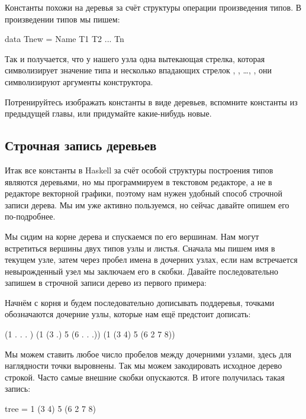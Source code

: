 Константы похожи на деревья за счёт структуры операции
произведения типов. В произведении типов мы пишем:

\begin{code}
data Tnew = Name T1 T2 ... Tn
\end{code}

Так и получается, что у нашего узла  одна вытекающая
стрелка, которая символизирует значение типа  и несколько
впадающих стрелок , , \dots, , они символизируют 
аргументы конструктора.

Потренируйтесь изображать константы в виде деревьев, 
вспомните константы из предыдущей главы, или придумайте 
какие-нибудь новые. 

\subsection{Строчная запись деревьев}

Итак все константы в Haskell за счёт особой структуры построения
типов являются деревьями, но мы программируем в текстовом редакторе,
а не в редакторе векторной графики, поэтому нам нужен удобный способ
строчной записи дерева. Мы им уже активно пользуемся, но
сейчас давайте опишем его по-подробнее. 

Мы сидим на корне дерева и спускаемся по его вершинам. Нам
могут встретиться вершины двух типов узлы и листья. Сначала
мы пишем имя в текущем узле, затем через пробел имена в дочерних
узлах, если нам встречается невырожденный узел мы заключаем его в
скобки. Давайте последовательно запишем в строчной записи дерево
из первого примера:


Начнём с корня и будем последовательно дописывать поддеревья,
точками обозначаются дочерние узлы, которые нам ещё предстоит дописать:

\begin{code}
(1     .       .      .       )
(1    (3 .)    5     (6 . . .))
(1    (3 4)    5     (6 2 7 8))
\end{code}

Мы можем ставить любое число пробелов между дочерними узлами,
здесь для наглядности точки выровнены. Так мы можем закодировать
исходное дерево строкой. Часто самые внешние скобки опускаются.
В итоге получилась такая запись:

\begin{code}
tree = 1 (3 4) 5 (6 2 7 8)
\end{code}

